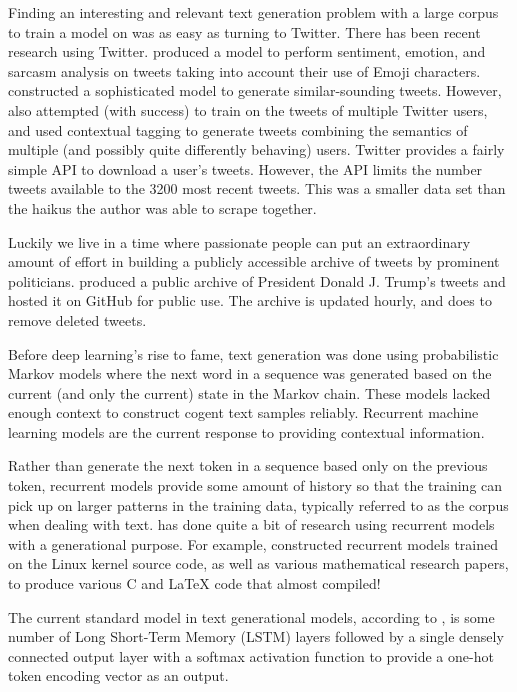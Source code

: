 \documentclass[letterpaper]{article}
\begin{document}
    Finding an interesting and relevant text generation problem with a large corpus to train a model on was as easy as turning to Twitter. There has been recent research using Twitter. \citet{felbo_2017} produced a model to perform sentiment, emotion, and sarcasm analysis on tweets taking into account their use of Emoji characters. \citet{woolf_2017} constructed a sophisticated model to generate similar-sounding tweets. However, \citet{woolf_2017} also attempted (with success) to train on the tweets of multiple Twitter users, and used contextual tagging to generate tweets combining the semantics of multiple (and possibly quite differently behaving) users. Twitter provides a fairly simple API to download a user's tweets. However, the API limits the number tweets available to the 3200 most recent tweets. This was a smaller data set than the haikus the author was able to scrape together.

    Luckily we live in a time where passionate people can put an extraordinary amount of effort in building a publicly accessible archive of tweets by prominent politicians. \citet{brown_2017} produced a public archive of President Donald J. Trump's tweets and hosted it on GitHub for public use. The archive is updated hourly, and does to remove deleted tweets.

    Before deep learning's rise to fame, text generation was done using probabilistic Markov models where the next word in a sequence was generated based on the current (and only the current) state in the Markov chain. These models lacked enough context to construct cogent text samples reliably. Recurrent machine learning models are the current response to providing contextual information.

    Rather than generate the next token in a sequence based only on the previous token, recurrent models provide some amount of history so that the training can pick up on larger patterns in the training data, typically referred to as the corpus when dealing with text. \citet{karpathy_2015} has done quite a bit of research using recurrent models with a generational purpose. For example, \citet{karpathy_2015} constructed recurrent models trained on the Linux kernel source code, as well as various mathematical research papers, to produce various C and \LaTeX{} code that almost compiled!

    The current standard model in text generational models, according to \citet{karpathy_2015}, is some number of Long Short-Term Memory (LSTM) layers followed by a single densely connected output layer with a softmax activation function to provide a one-hot token encoding vector as an output.
\end{document}
